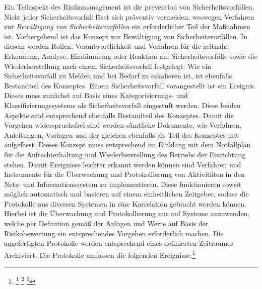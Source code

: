 \documentclass[11pt,a4paper,hidelinks]{article}   %
\begin{document}

                Ein Teilaspekt des Risikomanagement ist die prevention von Sicherheitsvorfällen. Nicht jeder Sicherheitsvorfall lässt sich präventiv vermeiden, weswegen Verfahren zur \emph{Bewältigung von Sicherheitsvorfällen} ein erforderlicher Teil der Maßnahmen ist. Vorhergehend ist das Konzept zur Bewältigung von Sicherheitsvorfällen. In diesem werden Rollen, Verantwortlichkeit und Verfahren für die zeitnahe Erkennung, Analyse, Eindämmung oder Reaktion auf Sicherheitsvorfälle sowie die Wiederherstellung nach einem Sicherheitsvorfall festgelegt. Wie ein Sicherheitsvorfall zu Melden und bei Bedarf zu eskalieren ist, ist ebenfalls Bestandteil des Konzeptes. Einem Sicherheitsvorfall vorangestellt ist ein Ereignis. Dieses muss zunächst auf Basis eines Kategorisierungs- und Klassifizierungssystems als Sicherheitsvorfall eingestuft werden. Diese beiden Aspekte sind entsprechend ebenfalls Bestandteil des Konzeptes. Damit die Vorgehen widerspruchsfrei sind werden sämtliche Dokumente, wie Verfahren, Anleitungen, Vorlagen und der gleichen ebenfalls als Teil des Konzeptes mit aufgefasst. Dieses Konzept muss entsprechend im Einklang mit dem Notfallplan für die Aufrechterhaltung und Wiederherstellung des Betriebs der Einrichtung stehen. Damit Ereignisse leichter erkannt werden können sind Verfahren und Instrumente für die Überwachung und Protokollierung von Aktivitäten in den Netz- und Informationssystem zu implementieren. Diese funktionieren soweit möglich automatisch und basieren auf einem einheitlichen Zeitgeber, sodass die Protokolle aus diversen Systemen in eine Korrelation gebracht werden können. Hierbei ist die Überwachung und Protokollierung nur auf Systeme anzuwenden, welche per Definition gemäß der Anlagen und Werte auf Basis der Risikobewertung ein entsprechendes Vorgehen erforderlich machen. Die angefertigten Protokolle werden entsprechend eines definierten Zeitraumes Archiviert. Die Protokolle umfassen die folgenden Ereignisse:\footnote{
                    \footcite[Vgl. Anhang, Nummer 3.1 - 3.2.3, 3.2.5 \& 3.2.6][]{EU2024-2690}
                    \footcite[Risikomanagement soll Sicherheitsvorfällen präventiv vermeiden][]{MISSING}
                    \footcite[Sicherheitsvorfälle kann man nicht immer vermeiden][]{MISSING}
                }
\end{document}
